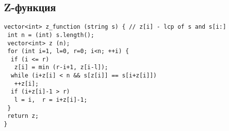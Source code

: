 \subsection{Z-функция}
\begin{lstlisting}
vector<int> z_function (string s) { // z[i] - lcp of s and s[i:]
 int n = (int) s.length();
 vector<int> z (n);
 for (int i=1, l=0, r=0; i<n; ++i) {
  if (i <= r)
   z[i] = min (r-i+1, z[i-l]);
  while (i+z[i] < n && s[z[i]] == s[i+z[i]])
   ++z[i];
  if (i+z[i]-1 > r)
   l = i,  r = i+z[i]-1;
 }
 return z;
}
\end{lstlisting}